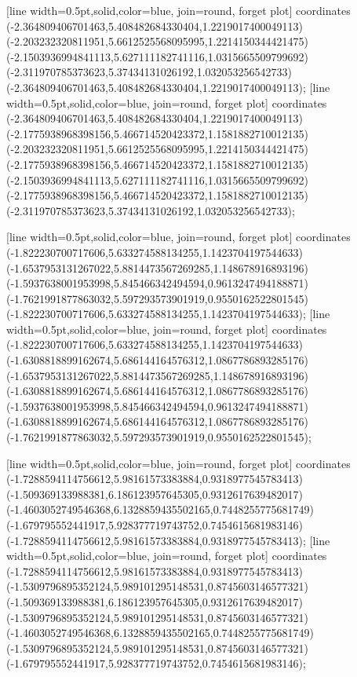 [line width=0.5pt,solid,color=blue, join=round, forget plot] coordinates {(-2.364809406701463,5.408482684330404,1.2219017400049113) (-2.203232320811951,5.6612525568095995,1.2214150344421475) (-2.1503936994841113,5.627111182741116,1.0315665509799692) (-2.311970785373623,5.37434131026192,1.032053256542733) (-2.364809406701463,5.408482684330404,1.2219017400049113)};
[line width=0.5pt,solid,color=blue, join=round, forget plot] coordinates {(-2.364809406701463,5.408482684330404,1.2219017400049113) (-2.1775938968398156,5.466714520423372,1.1581882710012135) (-2.203232320811951,5.6612525568095995,1.2214150344421475) (-2.1775938968398156,5.466714520423372,1.1581882710012135) (-2.1503936994841113,5.627111182741116,1.0315665509799692) (-2.1775938968398156,5.466714520423372,1.1581882710012135) (-2.311970785373623,5.37434131026192,1.032053256542733)};

[line width=0.5pt,solid,color=blue, join=round, forget plot] coordinates {(-1.822230700717606,5.633274588134255,1.1423704197544633) (-1.6537953131267022,5.8814473567269285,1.148678916893196) (-1.5937638001953998,5.845466342494594,0.9613247494188871) (-1.7621991877863032,5.597293573901919,0.9550162522801545) (-1.822230700717606,5.633274588134255,1.1423704197544633)};
[line width=0.5pt,solid,color=blue, join=round, forget plot] coordinates {(-1.822230700717606,5.633274588134255,1.1423704197544633) (-1.6308818899162674,5.686144164576312,1.0867786893285176) (-1.6537953131267022,5.8814473567269285,1.148678916893196) (-1.6308818899162674,5.686144164576312,1.0867786893285176) (-1.5937638001953998,5.845466342494594,0.9613247494188871) (-1.6308818899162674,5.686144164576312,1.0867786893285176) (-1.7621991877863032,5.597293573901919,0.9550162522801545)};

[line width=0.5pt,solid,color=blue, join=round, forget plot] coordinates {(-1.7288594114756612,5.98161573383884,0.9318977545783413) (-1.509369133988381,6.186123957645305,0.9312617639482017) (-1.4603052749546368,6.1328859435502165,0.7448255775681749) (-1.679795552441917,5.928377719743752,0.7454615681983146) (-1.7288594114756612,5.98161573383884,0.9318977545783413)};
[line width=0.5pt,solid,color=blue, join=round, forget plot] coordinates {(-1.7288594114756612,5.98161573383884,0.9318977545783413) (-1.5309796895352124,5.989101295148531,0.8745603146577321) (-1.509369133988381,6.186123957645305,0.9312617639482017) (-1.5309796895352124,5.989101295148531,0.8745603146577321) (-1.4603052749546368,6.1328859435502165,0.7448255775681749) (-1.5309796895352124,5.989101295148531,0.8745603146577321) (-1.679795552441917,5.928377719743752,0.7454615681983146)};

